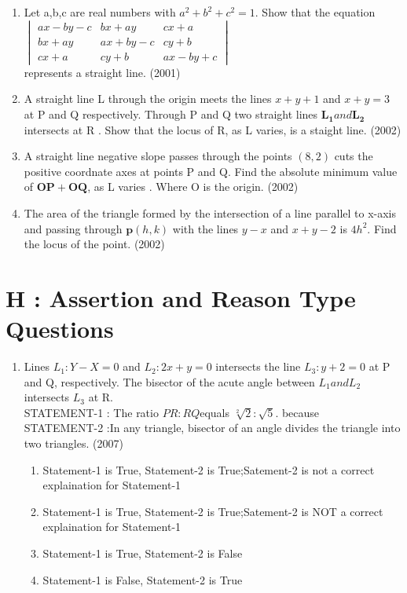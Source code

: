 \documentclass[12pt]{article}
\let\vec\mathbf
\begin{document}
\begin{enumerate}
\item Let a,b,c are real numbers with $a^2+b^2+c^2=1$. Show that the equation\\ 
$\begin{vmatrix}
 ax-by-c & bx+ay   & cx+a\\
 bx+ay   & ax+by-c & cy+b\\
 cx+a    & cy+b    & ax-by+c
\end{vmatrix}$ \\
represents a straight line.    (2001)
\item A straight line L through the origin meets the lines $x+y+1$ and $x+y=3$ at P and Q respectively. Through  P and Q two straight lines $\vec{L_1} and \vec{L_2}$ intersects at R . Show that the locus of R, as L varies, is a staight line. (2002)\\
\item A straight line negative slope passes through the points $(8,2)$ cuts the positive 
coordnate axes at points P and Q. Find the absolute minimum value of $\vec{OP}+\vec{OQ}$, as L varies . Where O is the origin. (2002)\\
\item The area of the triangle formed by the intersection of a line parallel to x-axis and passing through $\vec{p}(h,k)$ with the lines $y-x$ and $x+y-2$ is $4h^2$. Find the locus of the point. (2002)\\
\end{enumerate}

\section*{H   : Assertion and Reason Type Questions}

\begin{enumerate}
\item Lines $L_1: Y-X=0$ and $L_2 :2x+y=0$ intersects the line $L_3:y+2=0$ at P and Q, respectively. The bisector of the acute angle between $L_1 and L_2$ intersects $L_3$ at R.\\
STATEMENT-1 : The ratio $PR:RQ$equals $\sqrt[2]{2}:\sqrt{5}$. because \\
STATEMENT-2 :In any triangle, bisector of an angle divides the triangle into two triangles. (2007)
\begin{enumerate}
\item Statement-1 is True, Statement-2 is True;Satement-2 is not a correct explaination for Statement-1
\item Statement-1 is True, Statement-2 is True;Satement-2 is NOT a correct explaination for Statement-1
\item Statement-1 is True, Statement-2 is False
\item Statement-1 is False, Statement-2 is True
\end{enumerate}
\end{enumerate}
\end{document}
